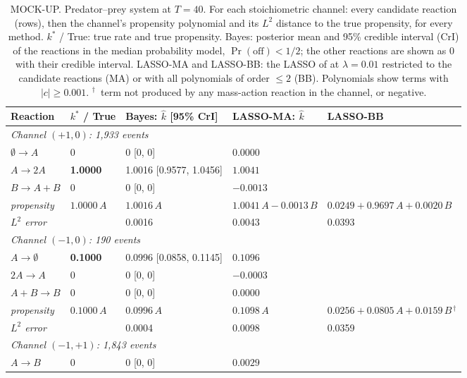 \begin{table}[htbp]
\centering
\footnotesize
\setlength{\tabcolsep}{3pt}
\caption{MOCK-UP. Predator--prey system at $T=40$. For each stoichiometric channel: every candidate reaction (rows), then the channel's propensity polynomial and its $L^2$ distance to the true propensity, for every method. $k^*$ / True: true rate and true propensity. Bayes: posterior mean and 95\% credible interval (CrI) of the reactions in the median probability model, $\Pr(\text{off})<1/2$; the other reactions are shown as $0$ with their credible interval. LASSO-MA and LASSO-BB: the LASSO of \cite{siam_Zhang2019} at $\lambda=0.01$ restricted to the candidate reactions (MA) or with all polynomials of order $\le 2$ (BB). Polynomials show terms with $|c|\ge 0.001$. $^\dagger$~term not produced by any mass-action reaction in the channel, or negative.}
\begin{tabular}{l l l l l}
\toprule
Reaction & $k^*$ / True & Bayes: $\hat k$ [95\% CrI] & LASSO-MA: $\hat k$ & LASSO-BB \\
\midrule
\multicolumn{5}{l}{\textit{Channel $(+1,0)$: 1{,}933 events}} \\
\quad $\emptyset\to A$ & $0$ & 0 [0, 0] & $0.0000$ &  \\
\quad $A\to 2A$ & \textbf{1.0000} & 1.0016 [0.9577, 1.0456] & $1.0041$ &  \\
\quad $B\to A+B$ & $0$ & 0 [0, 0] & $-0.0013$ &  \\
\cmidrule(l{1.5em}){1-5}
\qquad \textit{propensity} & $1.0000\,A$ & $1.0016\,A$ & $1.0041\,A - 0.0013\,B$ & $0.0249 + 0.9697\,A + 0.0020\,B$ \\
\qquad \textit{$L^2$ error} & & 0.0016 & 0.0043 & 0.0393 \\
\midrule
\multicolumn{5}{l}{\textit{Channel $(-1,0)$: 190 events}} \\
\quad $A\to \emptyset$ & \textbf{0.1000} & 0.0996 [0.0858, 0.1145] & $0.1096$ &  \\
\quad $2A\to A$ & $0$ & 0 [0, 0] & $-0.0003$ &  \\
\quad $A+B\to B$ & $0$ & 0 [0, 0] & $0.0000$ &  \\
\cmidrule(l{1.5em}){1-5}
\qquad \textit{propensity} & $0.1000\,A$ & $0.0996\,A$ & $0.1098\,A$ & $0.0256 + 0.0805\,A + 0.0159\,B{}^{\,\dagger}$ \\
\qquad \textit{$L^2$ error} & & 0.0004 & 0.0098 & 0.0359 \\
\midrule
\multicolumn{5}{l}{\textit{Channel $(-1,+1)$: 1{,}843 events}} \\
\quad $A\to B$ & $0$ & 0 [0, 0] & $0.0029$ &  \\

\end{tabular}
\end{table}
